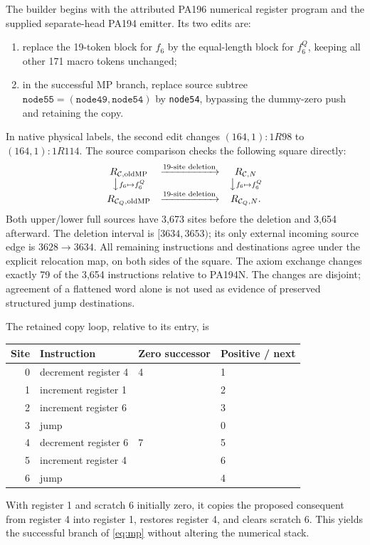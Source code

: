 \documentclass[10pt,letterpaper]{article}
\newcommand{\C}{\mathcal C}
\newcommand{\CQ}{\mathcal C_Q}
\begin{document}
The builder begins with the attributed PA196 numerical register program
and the supplied separate-head PA194 emitter. Its two edits are:
\begin{enumerate}
\item replace the 19-token block for \(f_6\) by the equal-length block for
      \(f_6^Q\), keeping all other 171 macro tokens unchanged;
\item in the successful MP branch, replace source subtree
      \(\texttt{node55}=(\texttt{node49},\texttt{node54})\) by
      \texttt{node54}, bypassing the dummy-zero push and retaining the copy.
\end{enumerate}
In native physical labels, the second edit changes
\((164,1):1R98\) to \((164,1):1R114\).
The source comparison checks the following square directly:
\[
\begin{array}{ccc}
 R_{\C,\mathrm{oldMP}}&\xrightarrow{\text{19-site deletion}}&R_{\C,N}\\
 \big\downarrow\scriptstyle{f_6\mapsto f_6^Q}&&
 \big\downarrow\scriptstyle{f_6\mapsto f_6^Q}\\
 R_{\CQ,\mathrm{oldMP}}&\xrightarrow{\text{19-site deletion}}&R_{\CQ,N}.
\end{array}
\]
Both upper/lower full sources have 3,673 sites before the deletion and
3,654 afterward. The deletion interval is \([3634,3653)\); its only
external incoming source edge is \(3628\to3634\). All remaining
instructions and destinations agree under the explicit relocation map,
on both sides of the square. The axiom exchange changes exactly 79 of the
3,654 instructions relative to PA194N. The changes are disjoint; agreement
of a flattened word alone is not used as evidence of preserved structured
jump destinations.

The retained copy loop, relative to its entry, is
\begin{center}
\begin{tabular}{rlll}
\toprule
Site & Instruction & Zero successor & Positive / next\\\midrule
0 & decrement register 4 & 4 & 1\\
1 & increment register 1 & & 2\\
2 & increment register 6 & & 3\\
3 & jump & & 0\\
4 & decrement register 6 & 7 & 5\\
5 & increment register 4 & & 6\\
6 & jump & & 4\\\bottomrule
\end{tabular}
\end{center}
With register 1 and scratch 6 initially zero, it copies the proposed
consequent from register 4 into register 1, restores register 4, and clears
scratch 6. This yields the successful branch of \eqref{eq:mp} without
altering the numerical stack.
\end{document}

